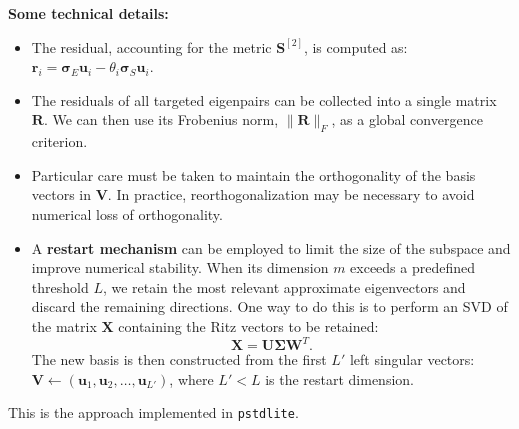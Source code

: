 \documentclass[10pt,aspectratio=169]{beamer}
\begin{document}
\begin{frame}
	\textbf{Some technical details:}
	\begin{itemize}
		\item The residual, accounting for the metric $\mathbf S^{[2]}$, is computed as: $
			\mathbf r_i=\boldsymbol{\sigma}_E\mathbf u_i-\theta_i\boldsymbol{\sigma}_S\mathbf u_i$.
			\pause
		\item The residuals of all targeted eigenpairs can be collected into a single matrix $\mathbf R$. We can then use its Frobenius norm, $\|\mathbf R\|_F$, as a global convergence criterion.
		\pause
		\item Particular care must be taken to maintain the orthogonality of the basis vectors in $\mathbf V$. In practice, reorthogonalization may be necessary to avoid numerical loss of orthogonality.
		\pause
		\item A \textbf{restart mechanism} can be employed to limit the size of the subspace and improve numerical stability. When its dimension $m$ exceeds a predefined threshold $L$, we retain the most relevant approximate eigenvectors and discard the remaining directions. One way to do this is to perform an SVD of the matrix $\mathbf X$ containing the Ritz vectors to be retained:
		\begin{equation*}
			\mathbf X=\mathbf U\boldsymbol{\Sigma}\mathbf W^T.
		\end{equation*}
		The new basis is then constructed from the first $L'$ left singular vectors: $\mathbf V\gets(\mathbf u_1,\mathbf u_2,\ldots,\mathbf u_{L'})$, where $L'<L$ is the restart dimension.
	\end{itemize}
	
	\medskip
	This is the approach implemented in \texttt{pstdlite}.
\end{frame}
\end{document}
